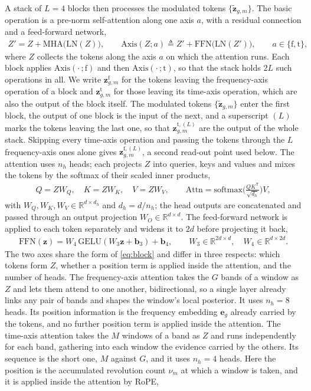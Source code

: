 \documentclass[journal,onecolumn]{IEEEtran}
\begin{document}
A stack of $L=4$ blocks then processes the modulated tokens $\{\tilde{\mathbf{z}}_{g,m}\}$. The basic operation is a pre-norm self-attention along one axis $a$, with a residual connection and a feed-forward network,
\begin{eqnarray}
\label{eq:block}
Z'=Z+\mathrm{MHA}\big(\mathrm{LN}(Z)\big),
\qquad
\mathrm{Axis}(Z;a)\triangleq Z'+\mathrm{FFN}\big(\mathrm{LN}(Z')\big),
\qquad a\in\{\mathrm{f},\mathrm{t}\},
\end{eqnarray}
where $Z$ collects the tokens along the axis $a$ on which the attention runs. Each block applies $\mathrm{Axis}(\cdot\,;\mathrm{f})$ and then $\mathrm{Axis}(\cdot\,;\mathrm{t})$, so that the stack holds $2L$ such operations in all. We write $\mathbf{z}^{\mathrm{f}}_{g,m}$ for the tokens leaving the frequency-axis operation of a block and $\mathbf{z}^{\mathrm{t}}_{g,m}$ for those leaving its time-axis operation, which are also the output of the block itself. The modulated tokens $\{\tilde{\mathbf{z}}_{g,m}\}$ enter the first block, the output of one block is the input of the next, and a superscript $(L)$ marks the tokens leaving the last one, so that $\mathbf{z}^{\mathrm{t},(L)}_{g,m}$ are the output of the whole stack. Skipping every time-axis operation and passing the tokens through the $L$ frequency-axis ones alone gives $\mathbf{z}^{\mathrm{f},(L)}_{g,m}$, a second read-out point used below. The attention uses $n_h$ heads; each projects $Z$ into queries, keys and values and mixes the tokens by the softmax of their scaled inner products,
\begin{eqnarray}
\label{eq:mha}
Q=ZW_Q,\quad K=ZW_K,\quad V=ZW_V,
\qquad
\mathrm{Attn}=\mathrm{softmax}\!\Big(\frac{QK^{\mathsf T}}{\sqrt{d_h}}\Big)V,
\end{eqnarray}
with $W_Q,W_K,W_V\in\mathbb{R}^{d\times d_h}$ and $d_h=d/n_h$; the head outputs are concatenated and passed through an output projection $W_O\in\mathbb{R}^{d\times d}$. The feed-forward network is applied to each token separately and widens it to $2d$ before projecting it back,
\begin{eqnarray}
\label{eq:ffn}
\mathrm{FFN}(\mathbf{z})=W_4\,\mathrm{GELU}(W_3\mathbf{z}+\mathbf{b}_3)+\mathbf{b}_4,
\qquad W_3\in\mathbb{R}^{2d\times d},\quad W_4\in\mathbb{R}^{d\times 2d}.
\end{eqnarray}
The two axes share the form of \eqref{eq:block} and differ in three respects: which tokens form $Z$, whether a position term is applied inside the attention, and the number of heads. The frequency-axis attention takes the $G$ bands of a window as $Z$ and lets them attend to one another, bidirectional, so a single layer already links any pair of bands and shapes the window's local posterior. It uses $n_h=8$ heads. Its position information is the frequency embedding $\mathbf{e}_g$ already carried by the tokens, and no further position term is applied inside the attention. The time-axis attention takes the $M$ windows of a band as $Z$ and runs independently for each band, gathering into each window the evidence carried by the others. Its sequence is the short one, $M$ against $G$, and it uses $n_h=4$ heads. Here the position is the accumulated revolution count $\nu_m$ at which a window is taken, and it is applied inside the attention by RoPE,
\end{document}
